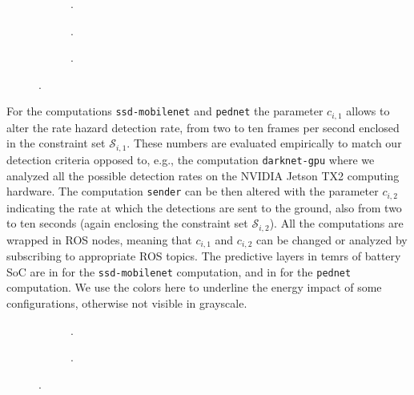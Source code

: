 \begin{figure}[h!]
  \centering
  \selectfont
  \footnotesize    
  \begin{subfigure}[b]{0.33\textwidth}
    \centering
    
    \caption{.}
    \label{fig:max-qos}
  \end{subfigure}
  \begin{subfigure}[b]{0.32\textwidth}
    \centering
    
    \caption{.}
    \label{fig:pednet}
  \end{subfigure}
  \begin{subfigure}[b]{0.33\textwidth}
    \centering
    
    \caption{.}
    \label{fig:mobilenet}
  \end{subfigure}
  \caption{.}
  \label{fig:computational}
\end{figure}
For the computations {\small\tt ssd-mobilenet} and {\small\tt pednet} the parameter $c_{i,1}$ allows to alter the rate hazard detection rate, from two to ten frames per second enclosed in the constraint set $\mathcal{S}_{i,1}$. These numbers are evaluated empirically to match our detection criteria opposed to, e.g., the computation {\small\tt darknet-gpu} where we analyzed all the possible detection rates on the NVIDIA Jetson TX2 computing hardware. The computation {\small\tt sender} can be then altered with the parameter $c_{i,2}$ indicating the rate at which the detections are sent to the ground, also from two to ten seconds (again enclosing the constraint set $\mathcal{S}_{i,2}$). All the computations are wrapped in ROS nodes, meaning that $c_{i,1}$ and $c_{i,2}$ can be changed or analyzed by subscribing to appropriate ROS topics. The predictive layers in temrs of battery SoC are in  for the {\small\tt ssd-mobilenet} computation, and in  for the {\small\tt pednet} computation. We use the colors here to underline the energy impact of some configurations, otherwise not visible in grayscale.
\begin{figure}[h!]
  \centering
  \selectfont
  \footnotesize
  \begin{subfigure}[c]{0.47\textwidth}
    \centering
    
    \caption{.}
    \label{fig:cruise-energy}
  \end{subfigure}
  \begin{subfigure}[c]{0.47\textwidth}
    \centering
    
    \caption{.}
    \label{fig:cruise-merge}
  \end{subfigure}
  \caption{.}
  \label{fig:cruise-energies}
\end{figure}
